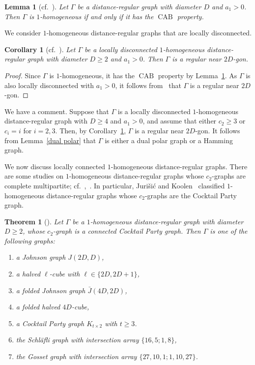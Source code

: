 \documentclass[11pt]{article}
\newtheorem{theorem}[theo]{Theorem}
\newtheorem{lemma}[theo]{Lemma}
\newtheorem{coro}[theo]{Corollary}
\theoremstyle{definition}
\numberwithin{equation}{section}
\numberwithin{equation}{section}
\begin{document}
\begin{lemma}[{cf.~\cite[Theorem~3.1]{JK2000-1}}]\label{CAB_D}
Let $\Gamma$ be a distance-regular graph with diameter $D$ and $a_1 > 0$. 
Then $\Gamma$ is $1$-homogeneous if and only if it has the $\operatorname{CAB}$ property.
\end{lemma}

We consider $1$-homogeneous distance-regular graphs that are locally disconnected.
\begin{coro}[{cf.~\cite[Corollary~3.3]{JK2000-1}}]\label{locally disconnected}
Let $\Gamma$ be a locally disconnected $1$-homogeneous distance-regular graph with diameter $D \geqslant 2$ and $a_1 > 0$.
Then $\Gamma$ is a regular near $2D$-gon.
\end{coro}
\begin{proof}
Since $\Gamma$ is $1$-homogeneous, it has the $\operatorname{CAB}$ property by Lemma~\ref{CAB_D}.
As $\Gamma$ is also locally disconnected with $a_1 > 0$, it follows from~\cite[Theorem 2.3]{JK2000-1} that $\Gamma$ is a regular near $2D$-gon.
\end{proof}

We have a comment.
Suppose that $\Gamma$ is a locally disconnected $1$-homogeneous distance-regular graph with $D \geqslant 4$ and $a_1 > 0$, and assume that either $c_2 \geqslant 3$ or $c_i = i$ for $i = 2,3$.
Then, by Corollary~\ref{locally disconnected}, $\Gamma$ is a regular near $2D$-gon. 
It follows from Lemma~\ref{dual polar} that $\Gamma$ is either a dual polar graph or a Hamming graph.

We now discuss locally connected $1$-homogeneous distance-regular graphs. 
There are some studies on $1$-homogeneous distance-regular graphs whose $c_2$-graphs are complete multipartite; cf.~\cite{JK2003},~\cite{JMT2010}. 
In particular, Juri\v si\' c and Koolen~\cite{JK2003} classified $1$-homogeneous distance-regular graphs whose $c_2$-graphs are the Cocktail Party graph.

\begin{theorem}[{\cite[Theorem 1.1]{JK2003}}]\label{1-homogenious JK}
Let $\Gamma$ be a $1$-homogeneous distance-regular graph with diameter $D \geqslant 2$, whose $c_2$-graph is a connected Cocktail Party graph. 
Then $\Gamma$ is one of the following graphs:
\begin{enumerate}[\normalfont(i)]
  \item a Johnson graph $J(2D,D)$,
  \item a halved $\ell$-cube with $\ell \in \{2D,2D+1\}$,
  \item a folded Johnson graph $\bar{J}(4D,2D)$,
  \item a folded halved $4D$-cube,
  \item a Cocktail Party graph $K_{t \times 2}$ with $t \geqslant 3$.
  \item the Schl\"{a}fli graph with intersection array $\{16,5;1,8\}$,
  \item the Gosset graph with intersection array $\{27,10,1; 1,10,27\}$.
\end{enumerate}
\end{theorem}
\end{document}
